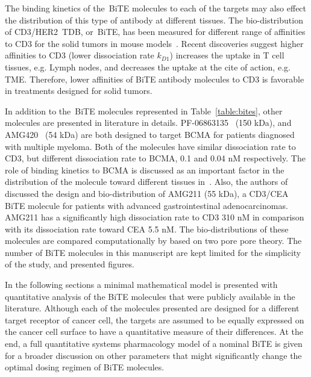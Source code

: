 The binding kinetics of the~\ac{BiTE} molecules to each of the targets may also effect the distribution of this type of antibody at different tissues. The bio-distribution of CD3/HER2~\ac{TDB}, or~\ac{BiTE}, has been measured for different range of affinities to CD3 for the solid tumors in mouse models~\cite{mandikian2018relative}. Recent discoveries suggest higher affinities to CD3 (lower dissociation rate $k_{D1}$) increases the uptake in T cell tissues, e.g. Lymph nodes, and decreases the uptake at the cite of action, e.g. \ac{TME}. Therefore, lower affinities of \ac{BiTE} antibody molecules to CD3 is favorable in treatments designed for solid tumors. 

In addition to the~\ac{BiTE} molecules represented in Table~\ref{table:bites}, other molecules are presented in literature in details. PF-06863135~\cite{panowski2019preclinical} (150 kDa), and AMG420~\cite{hipp2017novel} (54 kDa) are both designed to target BCMA for patients diagnosed with multiple myeloma. Both of the molecules have similar dissociation rate to CD3, but different dissociation rate to BCMA, 0.1 and 0.04 nM respectively. The role of binding kinetics to BCMA is discussed as an important factor in the distribution of the molecule toward different tissues in~\cite{hipp2017novel}. Also, the authors of~\cite{moek201989zr} discussed the design and bio-distribution of AMG211 (55 kDa), a CD3/CEA \ac{BiTE} molecule for patients with advanced gastrointestinal adenocarcinomas. AMG211 has a significantly high dissociation rate to CD3 310 nM in comparison with its dissociation rate toward CEA 5.5 nM. The bio-distributions of these molecules are compared computationally by \cite{yoneyama2021leveraging} based on two pore pore theory. The number of \ac{BiTE} molecules in this manuscript are kept limited for the simplicity of the study, and presented figures.  

In the following sections a minimal mathematical model is presented with quantitative analysis of the \ac{BiTE} molecules that were publicly available in the literature. Although each of the molecules presented are designed for a different target receptor of cancer cell, the targets are assumed to be equally expressed on the cancer cell surface to have a quantitative measure of their differences. At the end, a full quantitative systems pharmacology model of a nominal \ac{BiTE} is given for a broader discussion on other parameters that might significantly change the optimal dosing regimen of \ac{BiTE} molecules. 


